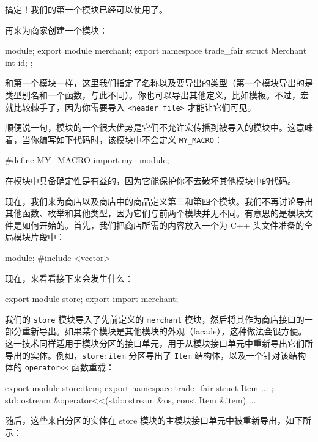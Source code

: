 搞定！我们的第一个模块已经可以使用了。

再来为商家创建一个模块：

\begin{codebox}[cpp]
module;
export module merchant;
export namespace trade_fair {
struct Merchant {
  int id;
};
}
\end{codebox}

和第一个模块一样，这里我们指定了名称以及要导出的类型（第一个模块导出的是类型别名和一个函数，与此不同）。你也可以导出其他定义，比如模板。不过，宏就比较棘手了，因为你需要导入 \texttt{<header\_\allowbreak{}file>} 才能让它们可见。

\label{idx:761}
顺便说一句，模块的一个很大优势是它们不允许宏传播到被导入的模块中。这意味着，当你编写如下代码时，该模块中不会定义 \texttt{MY\_MACRO}：

\begin{codebox}[python]
#define MY_MACRO
import my_module;
\end{codebox}

在模块中具备确定性是有益的，因为它能保护你不去破坏其他模块中的代码。

现在，我们来为商店以及商店中的商品定义第三和第四个模块。我们不再讨论导出其他函数、枚举和其他类型，因为它们与前两个模块并无不同。有意思的是模块文件是如何开始的。首先，我们把商店所需的内容放入一个为 C++ 头文件准备的全局模块片段中：

\begin{codebox}[cpp]
module;
#include <vector>
\end{codebox}

现在，来看看接下来会发生什么：

\begin{codebox}[text]
export module store;
export import merchant;
\end{codebox}

我们的 \texttt{store} 模块导入了先前定义的 \texttt{merchant} 模块，然后将其作为商店接口的一部分重新导出。如果某个模块是其他模块的外观（facade），这种做法会很方便。这一技术同样适用于模块分区的接口单元，用于从模块接口单元中重新导出它们所导出的实体。例如，\texttt{store:item} 分区导出了 \texttt{Item} 结构体，以及一个针对该结构体的 \texttt{operator<<} 函数重载：

\begin{codebox}[cpp]
export module store:item;
export namespace trade_fair {
struct Item {
  ...
};
std::ostream &operator<<(std::ostream &os, const Item &item) {
  ...
}
}
\end{codebox}

随后，这些来自分区的实体在 store 模块的主模块接口单元中被重新导出，如下所示：

